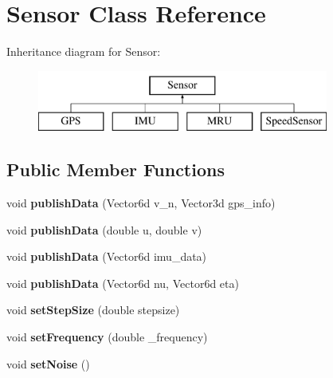 \section{Sensor Class Reference}
\label{class_sensor}
Inheritance diagram for Sensor\+:\begin{figure}[H]
\begin{center}
\leavevmode
\includegraphics[height=2.000000cm]{class_sensor}
\end{center}
\end{figure}
\subsection*{Public Member Functions}
\begin{DoxyCompactItemize}
\item 
void {\bfseries publish\+Data} (Vector6d v\+\_\+n, Vector3d gps\+\_\+info)\label{class_sensor_a45ddf880a759f03d22818e91860f0901}

\item 
void {\bfseries publish\+Data} (double u, double v)\label{class_sensor_a7fc20251253ec330e00725cf00688ee0}

\item 
void {\bfseries publish\+Data} (Vector6d imu\+\_\+data)\label{class_sensor_a5f103439ae3ed1cb84e8a35705a3c032}

\item 
void {\bfseries publish\+Data} (Vector6d nu, Vector6d eta)\label{class_sensor_af44389030d7336c5a24a87588bb31448}

\item 
void {\bfseries set\+Step\+Size} (double stepsize)\label{class_sensor_ae37c1cfa48a7f25497aae485f6f91265}

\item 
void {\bfseries set\+Frequency} (double \+\_\+frequency)\label{class_sensor_afe6b7b2849deccb1818da714de6c36ad}

\item 
void {\bfseries set\+Noise} ()\label{class_sensor_ac4b9625c973636b3f3c574bc7b2a922d}

\end{DoxyCompactItemize}
